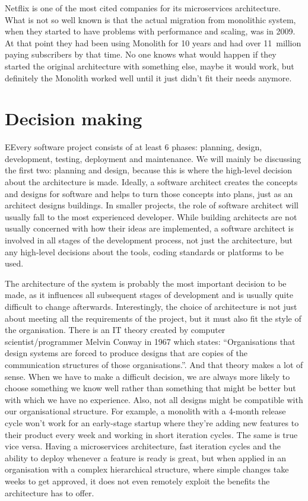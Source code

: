 \begin{note*}
    Netflix is one of the most cited companies for its microservices architecture. What is not so well known is that the actual migration from monolithic system, when they started to have problems with performance and scaling, was in 2009. At that point they had been using Monolith for 10 years and had over 11~million \cite{NETFLIX_2009_EARNINGS} paying subscribers by that time. No one knows what would happen if they started the original architecture with something else, maybe it would work, but definitely the Monolith worked well until it just didn't fit their needs anymore.
\end{note*}

\section{Decision making}
EEvery software project consists of at least 6 phases: planning, design, development, testing, deployment and maintenance. We will mainly be discussing the first two: planning and design, because this is where the high-level decision about the architecture is made. Ideally, a software architect creates the concepts and designs for software and helps to turn those concepts into plans, just as an architect designs buildings. In smaller projects, the role of software architect will usually fall to the most experienced developer. While building architects are not usually concerned with how their ideas are implemented, a software architect is involved in all stages of the development process, not just the architecture, but any high-level decisions about the tools, coding standards or platforms to be used.

The architecture of the system is probably the most important decision to be made, as it influences all subsequent stages of development and is usually quite difficult to change afterwards. Interestingly, the choice of architecture is not just about meeting all the requirements of the project, but it must also fit the style of the organisation. There is an IT theory created by computer scientist/programmer Melvin Conway in 1967 which states: ``Organisations that design systems are forced to produce designs that are copies of the communication structures of those organisations.''\cite{paper:conway:1968}. And that theory makes a lot of sense. When we have to make a difficult decision, we are always more likely to choose something we know well rather than something that might be better but with which we have no experience. Also, not all designs might be compatible with our organisational structure. For example, a monolith with a 4-month release cycle won't work for an early-stage startup where they're adding new features to their product every week and working in short iteration cycles. The same is true vice versa. Having a microservices architecture, fast iteration cycles and the ability to deploy whenever a feature is ready is great, but when applied in an organisation with a complex hierarchical structure, where simple changes take weeks to get approved, it does not even remotely exploit the benefits the architecture has to offer.

